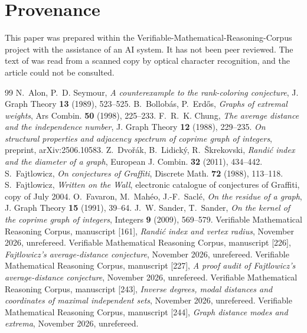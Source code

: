 \documentclass[11pt]{amsart}
\theoremstyle{definition}
\theoremstyle{remark}
\begin{document}
\section*{Provenance}
This paper was prepared within the Verifiable-Mathematical-Reasoning-Corpus project with the assistance of an AI system. It has not been peer reviewed. The text of \cite{WOW} was read from a scanned copy by optical character recognition, and the article \cite{Faj88} could not be consulted.

\begin{thebibliography}{99}
 N.~Alon, P.~D. Seymour, \emph{A counterexample to the rank-coloring conjecture}, J. Graph Theory \textbf{13} (1989), 523--525.
 B.~Bollob\'as, P.~Erd\H{o}s, \emph{Graphs of extremal weights}, Ars Combin. \textbf{50} (1998), 225--233.
 F.~R.~K. Chung, \emph{The average distance and the independence number}, J. Graph Theory \textbf{12} (1988), 229--235.
 \emph{On structural properties and adjacency spectrum of coprime graph of integers}, preprint, arXiv:2506.10583.
 Z.~Dvo\v{r}\'ak, B.~Lidick\'y, R.~\v{S}krekovski, \emph{Randi\'c index and the diameter of a graph}, European J. Combin. \textbf{32} (2011), 434--442.
 S.~Fajtlowicz, \emph{On conjectures of Graffiti}, Discrete Math. \textbf{72} (1988), 113--118.
 S.~Fajtlowicz, \emph{Written on the Wall}, electronic catalogue of conjectures of Graffiti, copy of July 2004.
 O.~Favaron, M.~Mah\'eo, J.-F.~Sacl\'e, \emph{On the residue of a graph}, J. Graph Theory \textbf{15} (1991), 39--64.
 J.~W. Sander, T.~Sander, \emph{On the kernel of the coprime graph of integers}, Integers \textbf{9} (2009), 569--579.
 Verifiable Mathematical Reasoning Corpus, manuscript [161], \emph{Randi\'c index and vertex radius}, November 2026, unrefereed.
 Verifiable Mathematical Reasoning Corpus, manuscript [226], \emph{Fajtlowicz's average-distance conjecture}, November 2026, unrefereed.
 Verifiable Mathematical Reasoning Corpus, manuscript [227], \emph{A proof audit of Fajtlowicz's average-distance conjecture}, November 2026, unrefereed.
 Verifiable Mathematical Reasoning Corpus, manuscript [243], \emph{Inverse degrees, modal distances and coordinates of maximal independent sets}, November 2026, unrefereed.
 Verifiable Mathematical Reasoning Corpus, manuscript [244], \emph{Graph distance modes and extrema}, November 2026, unrefereed.
\end{thebibliography}
\end{document}
